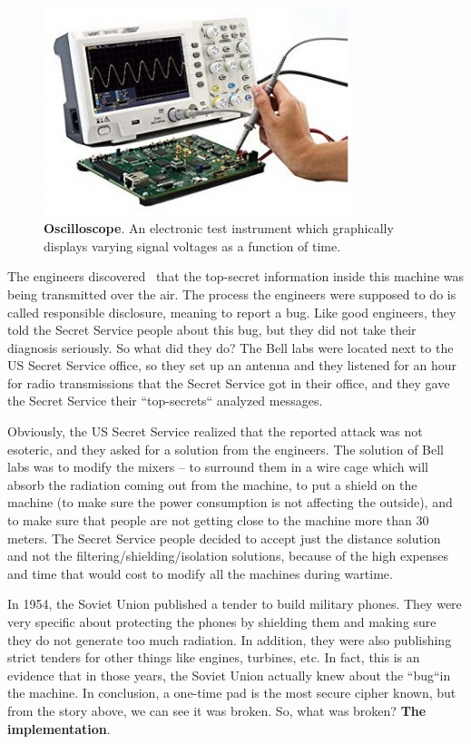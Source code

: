\begin{figure}
    \centering
    \includegraphics[width=0.8\textwidth]{images/ch1_Intro/oscilloscope.jpg}
    \caption{\textbf{Oscilloscope}. An electronic test instrument which graphically displays varying signal voltages as a function of time.}
    \label{fig:Oscillo}
\end{figure}

The engineers discovered~\cite{NSAsecret} that the top-secret information inside
this machine was being transmitted over the air. The process the engineers were
supposed to do is called responsible disclosure, meaning to report a bug. Like
good engineers, they told the Secret Service people about this bug, but they
did not take their diagnosis seriously. So what did they do? The Bell labs were
located next to the US Secret Service office, so they set up an antenna and
they listened for an hour for radio transmissions that the Secret Service got in
their office, and they gave the Secret Service their ``top-secrets`` analyzed
messages.

Obviously, the US Secret Service realized that the reported attack was not
esoteric, and they asked for a solution from the engineers. The solution of Bell
labs was to modify the mixers – to surround them in a wire cage which will
absorb the radiation coming out from the machine, to put a shield on the
machine (to make sure the power consumption is not affecting the outside), and
to make sure that people are not getting close to the machine more than 30
meters. The Secret Service people decided to accept just the distance solution
and not the filtering/shielding/isolation solutions, because of the high
expenses and time that would cost to modify all the machines during wartime.

In 1954, the Soviet Union published a tender to build military phones. They were
very specific about protecting the phones by shielding them and making sure they
do not generate too much radiation. In addition, they were also publishing strict tenders for other things like engines, turbines, etc. In fact, this is an evidence that in those years, the Soviet Union actually knew about the ``bug``in the machine.
In conclusion, a one-time pad is the most secure cipher known, but from
the story above, we can see it was broken. So, what was broken? \textbf{The
implementation}.

